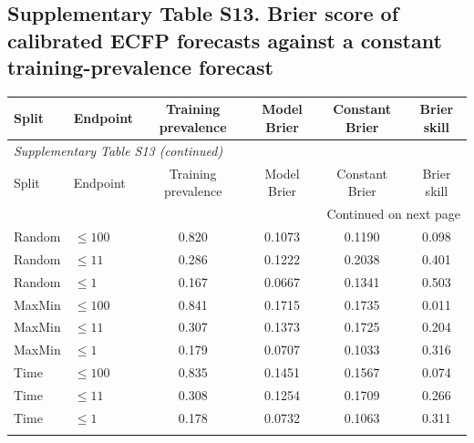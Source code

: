 \subsection*{Supplementary Table S13. Brier score of calibrated ECFP forecasts against a constant training-prevalence forecast}
\begin{longtable}{llcccc}

\toprule Split & Endpoint & Training prevalence & Model Brier & Constant Brier & Brier skill \\ \midrule\endfirsthead
\multicolumn{6}{l}{\textit{Supplementary Table S13 (continued)}} \\
\toprule Split & Endpoint & Training prevalence & Model Brier & Constant Brier & Brier skill \\ \midrule\endhead
\midrule\multicolumn{6}{r}{Continued on next page}\\\endfoot
\bottomrule\endlastfoot
Random & $\leq100$ & 0.820 & 0.1073 & 0.1190 & 0.098 \\
Random & $\leq11$ & 0.286 & 0.1222 & 0.2038 & 0.401 \\
Random & $\leq1$ & 0.167 & 0.0667 & 0.1341 & 0.503 \\
\addlinespace
MaxMin & $\leq100$ & 0.841 & 0.1715 & 0.1735 & 0.011 \\
MaxMin & $\leq11$ & 0.307 & 0.1373 & 0.1725 & 0.204 \\
MaxMin & $\leq1$ & 0.179 & 0.0707 & 0.1033 & 0.316 \\
\addlinespace
Time & $\leq100$ & 0.835 & 0.1451 & 0.1567 & 0.074 \\
Time & $\leq11$ & 0.308 & 0.1254 & 0.1709 & 0.266 \\
Time & $\leq1$ & 0.178 & 0.0732 & 0.1063 & 0.311 \\
\addlinespace
\end{longtable}